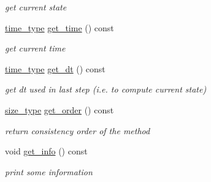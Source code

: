 \begin{DoxyCompactItemize}
\begin{DoxyCompactList}\small\item\em get current state \item\end{DoxyCompactList}\item 
\hypertarget{classhdnum_1_1RKF45_a5f9dfeeba9abeee37fdc5e8d79d30488}{
\hyperlink{classhdnum_1_1RKF45_a27ab73a7d7756f59d4422a96afd9ea00}{time\_\-type} \hyperlink{classhdnum_1_1RKF45_a5f9dfeeba9abeee37fdc5e8d79d30488}{get\_\-time} () const }
\label{classhdnum_1_1RKF45_a5f9dfeeba9abeee37fdc5e8d79d30488}

\begin{DoxyCompactList}\small\item\em get current time \item\end{DoxyCompactList}\item 
\hypertarget{classhdnum_1_1RKF45_aee7cdf5b333ca31418917f76ab70dcef}{
\hyperlink{classhdnum_1_1RKF45_a27ab73a7d7756f59d4422a96afd9ea00}{time\_\-type} \hyperlink{classhdnum_1_1RKF45_aee7cdf5b333ca31418917f76ab70dcef}{get\_\-dt} () const }
\label{classhdnum_1_1RKF45_aee7cdf5b333ca31418917f76ab70dcef}

\begin{DoxyCompactList}\small\item\em get dt used in last step (i.e. to compute current state) \item\end{DoxyCompactList}\item 
\hypertarget{classhdnum_1_1RKF45_ace56b907855d8323b4161ebc3e3d20dc}{
\hyperlink{classhdnum_1_1RKF45_a7fd97c231601ffb9373fbb5dad8a60f3}{size\_\-type} \hyperlink{classhdnum_1_1RKF45_ace56b907855d8323b4161ebc3e3d20dc}{get\_\-order} () const }
\label{classhdnum_1_1RKF45_ace56b907855d8323b4161ebc3e3d20dc}

\begin{DoxyCompactList}\small\item\em return consistency order of the method \item\end{DoxyCompactList}\item 
\hypertarget{classhdnum_1_1RKF45_af3f56f53dc2398a808e4fa85c658c56c}{
void \hyperlink{classhdnum_1_1RKF45_af3f56f53dc2398a808e4fa85c658c56c}{get\_\-info} () const }
\label{classhdnum_1_1RKF45_af3f56f53dc2398a808e4fa85c658c56c}

\begin{DoxyCompactList}\small\item\em print some information \item\end{DoxyCompactList}\end{DoxyCompactItemize}


